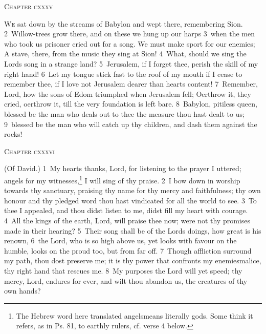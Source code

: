 \documentclass[10pt]{book} %
\begin{document}
\begin{large}\begin{center}\textsc{Chapter cxxxv}\end{center}\end{large}
\lettrine[lines=2]{W}{e} sat down by the streams of Babylon and wept there, remembering Sion. \textcolor{benred8}{2}~Willow-trees grow there, and on these we hung up our harps \textcolor{benred8}{3}~when the men who took us prisoner cried out for a song. We must make sport for our enemies; A stave, there, from the music they sing at Sion! \textcolor{benred8}{4}~What, should we sing the Lord\textquotesingle s song in a strange land? \textcolor{benred8}{5}~Jerusalem, if I forget thee, perish the skill of my right hand! \textcolor{benred8}{6}~Let my tongue stick fast to the roof of my mouth if I cease to remember thee, if I love not Jerusalem dearer than heart\textquotesingle s content! \textcolor{benred8}{7}~Remember, Lord, how the sons of Edom triumphed when Jerusalem fell; O\textquotesingle erthrow it, they cried, o\textquotesingle erthrow it, till the very foundation is left bare. \textcolor{benred8}{8}~Babylon, pitiless queen, blessed be the man who deals out to thee the measure thou hast dealt to us; \textcolor{benred8}{9}~blessed be the man who will catch up thy children, and dash them against the rocks!
\begin{large}\begin{center}\textsc{Chapter cxxxvi}\end{center}\end{large}
(Of David.)
\textcolor{benred8}{1}~My heart\textquotesingle s thanks, Lord, for listening to the prayer I uttered; angels for my witnesses,\footnote[1]{The Hebrew word here translated \textasciigrave angels\textquotesingle  means literally \textasciigrave gods\textquotesingle . Some think it refers, as in Ps. 81, to earthly rulers, cf. verse 4 below.} I will sing of thy praise. \textcolor{benred8}{2}~I bow down in worship towards thy sanctuary, praising thy name for thy mercy and faithfulness; thy own honour and thy pledged word thou hast vindicated for all the world to see. \textcolor{benred8}{3}~To thee I appealed, and thou didst listen to me, didst fill my heart with courage. \textcolor{benred8}{4}~All the kings of the earth, Lord, will praise thee now; were not thy promises made in their hearing? \textcolor{benred8}{5}~Their song shall be of the Lord\textquotesingle s doings, how great is his renown, \textcolor{benred8}{6}~the Lord, who is so high above us, yet looks with favour on the humble, looks on the proud too, but from far off. \textcolor{benred8}{7}~Though affliction surround my path, thou dost preserve me; it is thy power that confronts my enemies\textquotesingle  malice, thy right hand that rescues me. \textcolor{benred8}{8}~My purposes the Lord will yet speed; thy mercy, Lord, endures for ever, and wilt thou abandon us, the creatures of thy own hands?
\end{document}
